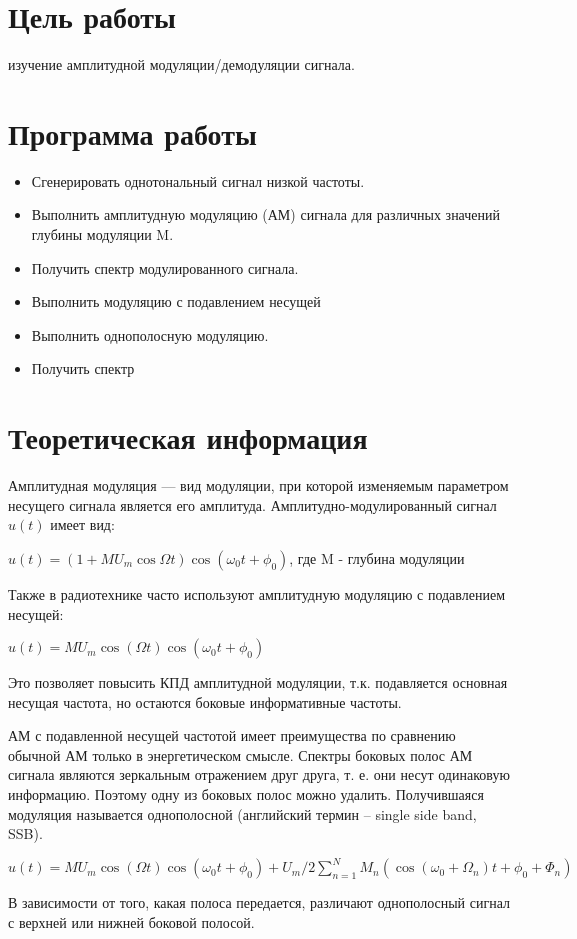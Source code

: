 
\usepackage{minted}

	
	
	
	\setcounter{page}{2}
	
	
	
	\section{Цель работы}
	изучение амплитудной модуляции/демодуляции сигнала.
	
	\section{Программа работы}
	\begin{itemize}
		\item Сгенерировать однотональный сигнал низкой частоты.
		\item Выполнить амплитудную модуляцию (АМ) сигнала для различных значений глубины модуляции M.
		\item Получить спектр модулированного сигнала.
		\item Выполнить модуляцию с подавлением несущей
		\item Выполнить однополосную модуляцию.
		\item Получить спектр
	\end{itemize}
	
	\section{Теоретическая информация}
	Амплитудная модуляция — вид модуляции, при которой изменяемым параметром несущего сигнала является его амплитуда. Амплитудно-модулированный сигнал $ u(t) $ имеет вид:
	\par
	\par
	$ u(t)=(1+MU_{m}\cos\Omega t)\cos(\omega _{0}t+\phi _{0}) $, где M - глубина модуляции
	\par
	Также в радиотехнике часто используют амплитудную модуляцию с подавлением несущей:
	\par
	$ u(t)=MU_{m}\cos(\Omega t)\cos(\omega _{0}t+\phi _{0}) $ 
	\par
	Это позволяет повысить КПД амплитудной модуляции, т.к. подавляется основная несущая частота, но остаются боковые информативные частоты.
	\par
	АМ с подавленной несущей частотой имеет преимущества по сравнению обычной АМ только в энергетическом смысле. Спектры боковых полос АМ сигнала являются зеркальным отражением друг друга, т. е. они несут одинаковую информацию. Поэтому одну из боковых полос можно удалить. Получившаяся модуляция называется однополосной (английский термин – single side band, SSB).
	\par
	$ u(t)=MU_{m}\cos(\Omega t)\cos(\omega _{0}t+\phi _{0})+U_{m}/2\sum \limits_{n=1}^{N}M_{n}(\cos(\omega_{0}+\Omega _{n})t+\phi _{0}+\Phi _{n}) $
	\par
	В зависимости от того, какая полоса передается, различают однополосный сигнал с верхней или нижней боковой полосой.
	\newpage
